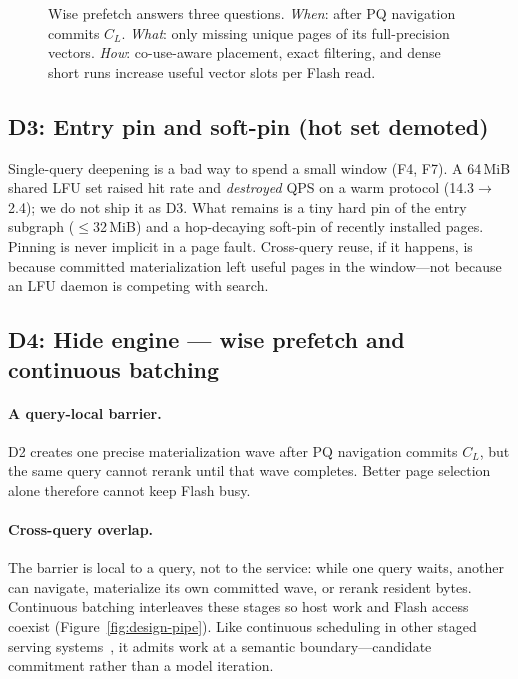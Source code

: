 \begin{figure}[t]
  \centering
  \resizebox{0.88\columnwidth}{!}{}
  \caption{Wise prefetch answers three questions.
    \emph{When}: after PQ navigation commits $C_L$.
    \emph{What}: only missing unique pages of its full-precision vectors.
    \emph{How}: co-use-aware placement, exact filtering, and dense short runs increase useful vector slots per Flash read.}
  \label{fig:design-promote}
\end{figure}

\subsection{D3: Entry pin and soft-pin (hot set demoted)}
\label{sec:d3}

Single-query deepening is a bad way to spend a small window (F4, F7).
A 64\,MiB shared LFU set raised hit rate and \emph{destroyed} QPS on a warm protocol (14.3$\rightarrow$2.4); we do not ship it as D3.
What remains is a tiny hard pin of the entry subgraph ($\le$32\,MiB) and a hop-decaying soft-pin of recently installed pages.
Pinning is never implicit in a page fault.
Cross-query reuse, if it happens, is because committed materialization left useful pages in the window---not because an LFU daemon is competing with search.

\subsection{D4: Hide engine --- wise prefetch and continuous batching}
\label{sec:d4}

\paragraph{A query-local barrier.}
D2 creates one precise materialization wave after PQ navigation commits $C_L$,
but the same query cannot rerank until that wave completes.
Better page selection alone therefore cannot keep Flash busy.

\paragraph{Cross-query overlap.}
The barrier is local to a query, not to the service: while one query waits,
another can navigate, materialize its own committed wave, or rerank resident
bytes.
Continuous batching interleaves these stages so host work and Flash access
coexist (Figure~\ref{fig:design-pipe}).
Like continuous scheduling in other staged serving systems~\cite{orca}, it
admits work at a semantic boundary---candidate commitment rather than a model
iteration.

